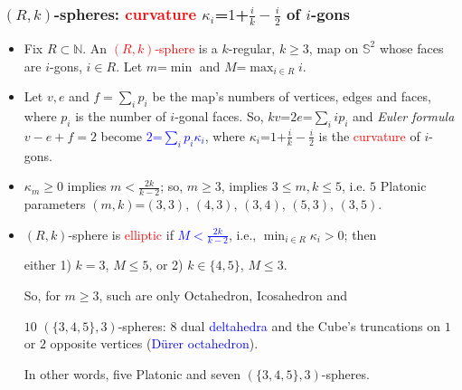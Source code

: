 \documentclass{beamer}
\begin{document}
\begin{frame}\frametitle{$(R,k)$-spheres:  
 \textcolor{red}{curvature} $\kappa_i$=$1$+$\frac{i}{k}-\frac{i}{2}$
of  $i$-gons}
\vspace{-2mm}
\begin{itemize}
\item Fix $R\subset \mathbb{N}$. An  \textcolor{red}{$(R,k)$-sphere}  is 
a $k$-regular, $k\ge 3$,  map on 
$\mathbb{S}^2$ 
whose faces are $i$-gons,
$i\in R$. Let $m$=$\min$
 and $M$=$\max_{i\in R}i$.
 

\item Let $v,e$ and $f=\sum_{i}p_i$ be the map's numbers of 
vertices, edges and faces, where $p_i$ is the number 
of $i$-gonal faces. 
So, $kv$=$2e$=$\sum_{i}ip_i$ and  
 {\em Euler formula $v-e+f=2$}
become   \textcolor{blue}{$2$=$\sum_{i}p_i\kappa_i$}, where 
$\kappa_i$=$1$+$\frac{i}{k}-\frac{i}{2}$ is 
the \textcolor{red}{curvature} of $i$-gons.

\item $\kappa_m$$\ge $$0$ implies $m$$<$$\frac{2k}{k-2}$; so, 
 $m$$\ge$$3$, 
 implies $3\le m,k\le 5$,
i.e.  $5$ Platonic 
parameters
$(m,k)$=$(3,3)$, $(4,3)$, $(3,4)$, $(5,3)$, $(3,5)$.
\pause

\item $(R,k)$-sphere is \textcolor{red}{elliptic} if 
\textcolor{blue}{$M$$<$$\frac{2k}{k-2}$}, i.e., $\min_{i\in 
R}\kappa_i>0$;  then 

either  
1) $k=3$, $M\le 5$,  or 2) $k\in \{4,5\}$,  $M\le 3$.

So, for $m\ge 3$, such are only 
Octahedron, 
Icosahedron and 

$10$ $(\{3,4,5\},3)$-spheres: $8$ dual 
 \textcolor{blue}{deltahedra} and the Cube's  truncations on $1$ or $2$ 
opposite vertices (\textcolor{blue}{D\"{u}rer octahedron}).

In other words, five Platonic  and seven $(\{3,4,5\},3)$-spheres.
\end{itemize}

\end{frame}
\end{document}
